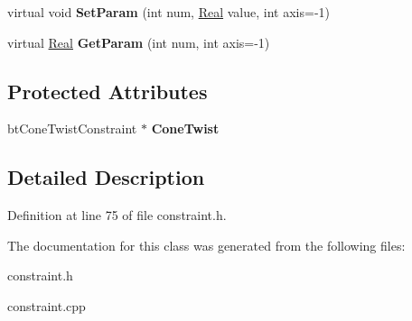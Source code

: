 \begin{DoxyCompactItemize}
\item 
\hypertarget{classphys_1_1ConeTwistConstraint_a555fc33b10a0c156e0ac93b94587098a}{
virtual void {\bfseries SetParam} (int num, \hyperlink{namespacephys_af7eb897198d265b8e868f45240230d5f}{Real} value, int axis=-\/1)}
\label{da/dbc/classphys_1_1ConeTwistConstraint_a555fc33b10a0c156e0ac93b94587098a}

\item 
\hypertarget{classphys_1_1ConeTwistConstraint_aab54f6c56622cef4314d3bbff194421e}{
virtual \hyperlink{namespacephys_af7eb897198d265b8e868f45240230d5f}{Real} {\bfseries GetParam} (int num, int axis=-\/1)}
\label{da/dbc/classphys_1_1ConeTwistConstraint_aab54f6c56622cef4314d3bbff194421e}

\end{DoxyCompactItemize}
\subsection*{Protected Attributes}
\begin{DoxyCompactItemize}
\item 
\hypertarget{classphys_1_1ConeTwistConstraint_a6bb25f6554b09cc9ce3afb7e1c46f074}{
btConeTwistConstraint $\ast$ {\bfseries ConeTwist}}
\label{da/dbc/classphys_1_1ConeTwistConstraint_a6bb25f6554b09cc9ce3afb7e1c46f074}

\end{DoxyCompactItemize}


\subsection{Detailed Description}


Definition at line 75 of file constraint.h.



The documentation for this class was generated from the following files:\begin{DoxyCompactItemize}
\item 
constraint.h\item 
constraint.cpp\end{DoxyCompactItemize}

